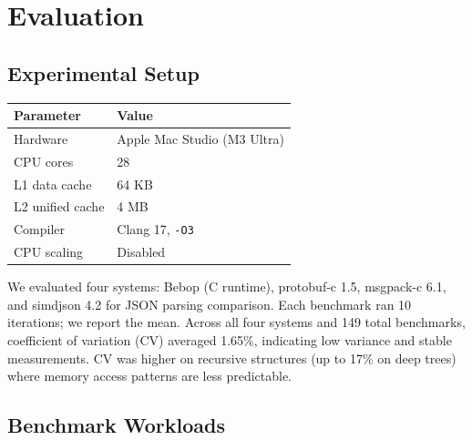 \documentclass[11pt,onecolumn]{article}
\begin{document}
\newpage
\section{Evaluation}
\label{sec:eval}

\subsection{Experimental Setup}

\begin{table}[ht]
\centering
\begin{tabular}{@{}ll@{}}
\toprule
\textbf{Parameter} & \textbf{Value} \\
\midrule
Hardware & Apple Mac Studio (M3 Ultra) \\
CPU cores & 28 \\
L1 data cache & 64 KB \\
L2 unified cache & 4 MB \\
Compiler & Clang 17, \texttt{-O3} \\
CPU scaling & Disabled \\
\bottomrule
\end{tabular}
\end{table}

We evaluated four systems: Bebop (C runtime), protobuf-c 1.5, msgpack-c 6.1, and simdjson 4.2 for JSON parsing comparison. Each benchmark ran 10 iterations; we report the mean. Across all four systems and 149 total benchmarks, coefficient of variation (CV) averaged 1.65\%, indicating low variance and stable measurements. CV was higher on recursive structures (up to 17\% on deep trees) where memory access patterns are less predictable.

\subsection{Benchmark Workloads}
\end{document}
